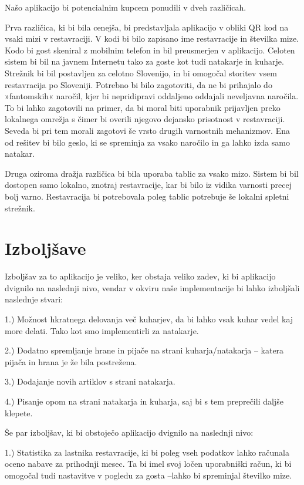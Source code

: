 \documentclass[a4paper, 12pt]{book}
\begin{document}
Našo aplikacijo bi potencialnim kupcem ponudili v dveh različicah.

Prva različica, ki bi bila cenejša, bi predstavljala aplikacijo v obliki QR kod na vsaki mizi v restavraciji. V kodi bi bilo zapisano ime restavracije in številka mize. Kodo bi gost skeniral z mobilnim telefon in bil preusmerjen v aplikacijo. Celoten sistem bi bil na javnem Internetu tako za goste kot tudi natakarje in kuharje. Strežnik bi bil postavljen za celotno Slovenijo, in bi omogočal storitev vsem restavracija po Sloveniji. Potrebno bi bilo zagotoviti, da ne bi prihajalo do »fantomskih« naročil, kjer bi nepridipravi oddaljeno oddajali neveljavna naročila. To bi lahko zagotovili na primer, da bi moral biti uporabnik prijavljen preko lokalnega omrežja s čimer bi overili njegovo dejansko prisotnost v restavraciji. Seveda bi pri tem morali zagotovi še vrsto drugih varnostnih mehanizmov. Ena od rešitev bi bilo geslo, ki se spreminja za vsako naročilo in ga lahko izda samo natakar. 

Druga oziroma dražja različica bi bila uporaba tablic za vsako mizo. Sistem bi bil dostopen samo lokalno, znotraj restavracije, kar bi bilo iz vidika varnosti precej bolj varno. Restavracija bi potrebovala poleg tablic potrebuje še lokalni spletni strežnik.

\section{Izboljšave}

Izboljšav za to aplikacijo je veliko, ker obstaja veliko zadev, ki bi aplikacijo dvignilo na naslednji nivo, vendar v okviru naše implementacije bi lahko izboljšali naslednje stvari:

1.) Možnost hkratnega delovanja več kuharjev, da bi lahko vsak kuhar vedel kaj more delati. Tako kot smo implementirli za natakarje.

2.) Dodatno spremljanje hrane in pijače na strani kuharja/natakarja – katera pijača in hrana je že bila postrežena.

3.) Dodajanje novih artiklov s strani natakarja.

4.) Pisanje opom na strani natakarja in kuharja, saj bi s tem preprečili daljše klepete.

Še par izboljšav, ki bi obstoječo aplikacijo dvignilo na naslednji nivo:

1.) Statistika za lastnika restavracije, ki bi poleg vseh podatkov lahko računala oceno nabave za prihodnji mesec. Ta bi imel svoj ločen uporabniški račun, ki bi omogočal tudi nastavitve v pogledu za gosta –lahko bi spreminjal številko mize. 
\end{document}
